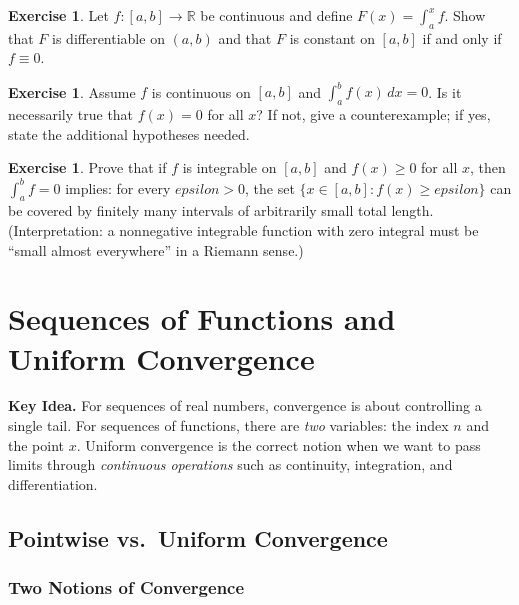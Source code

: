 \documentclass[12pt]{article}
\numberwithin{equation}{section}
\def\eps{epsilon}
\def\diff{d}
\newcommand{\RR}{\mathbb{R}}
\newcommand{\eps}{\varepsilon}               %
\newcommand{\diff}{\mathop{}\!\mathrm{d}}    %
\theoremstyle{plain}
\theoremstyle{definition}
\newtheorem{exercise}[theorem]{Exercise}
\theoremstyle{remark}
\newenvironment{keyidea}{\begin{tcolorbox}\textbf{Key Idea.}}{\end{tcolorbox}}
\begin{document}
\begin{exercise}
Let $f:[a,b]\to\RR$ be continuous and define $F(x)=\int_a^x f$.
Show that $F$ is differentiable on $(a,b)$ and that $F$ is constant on $[a,b]$ if and only if $f\equiv 0$.
\end{exercise}

\begin{exercise}
Assume $f$ is continuous on $[a,b]$ and $\int_a^b f(x)\,\diff x=0$.
Is it necessarily true that $f(x)=0$ for all $x$?
If not, give a counterexample; if yes, state the additional hypotheses needed.
\end{exercise}

\begin{exercise}
Prove that if $f$ is integrable on $[a,b]$ and $f(x)\ge 0$ for all $x$, then $\int_a^b f=0$ implies:
for every $\eps>0$, the set $\{x\in[a,b]: f(x)\ge \eps\}$ can be covered by finitely many intervals of arbitrarily small total length.
(Interpretation: a nonnegative integrable function with zero integral must be ``small almost everywhere'' in a Riemann sense.)
\end{exercise}

\newpage


\section{Sequences of Functions and Uniform Convergence}

\begin{keyidea}
For sequences of real numbers, convergence is about controlling a single tail.
For sequences of functions, there are \emph{two} variables: the index $n$ and the point $x$.
Uniform convergence is the correct notion when we want to pass limits through
\emph{continuous operations} such as continuity, integration, and differentiation.
\end{keyidea}

\subsection{Pointwise vs.\ Uniform Convergence}

\subsubsection{Two Notions of Convergence}
\end{document}
